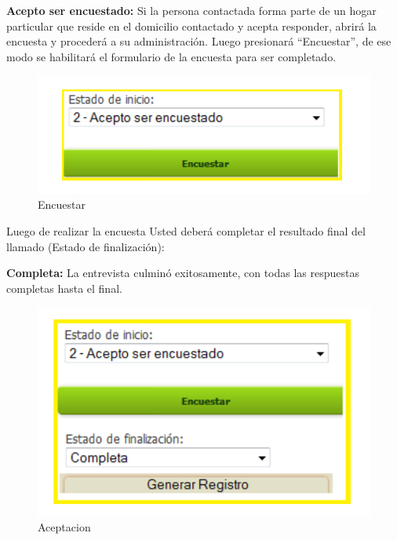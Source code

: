 \documentclass[
  openany]{book}
\begin{document}
\textbf{Acepto ser encuestado:} Si la persona contactada forma parte de un hogar particular que reside en el domicilio contactado y acepta responder, abrirá la encuesta y procederá a su administración. Luego presionará ``Encuestar'', de ese modo se habilitará el formulario de la encuesta para ser completado.

\begin{figure}

{\centering \includegraphics[width=1\linewidth]{imagenes/figura6-29} 

}

\caption{Encuestar}\label{fig:encuest}
\end{figure}

Luego de realizar la encuesta Usted deberá completar el resultado final del llamado (Estado de finalización):

\textbf{Completa:} La entrevista culminó exitosamente, con todas las respuestas completas hasta el final.

\begin{figure}

{\centering \includegraphics[width=1\linewidth]{imagenes/figura6-30} 

}

\caption{Aceptacion}\label{fig:encues}
\end{figure}
\end{document}
